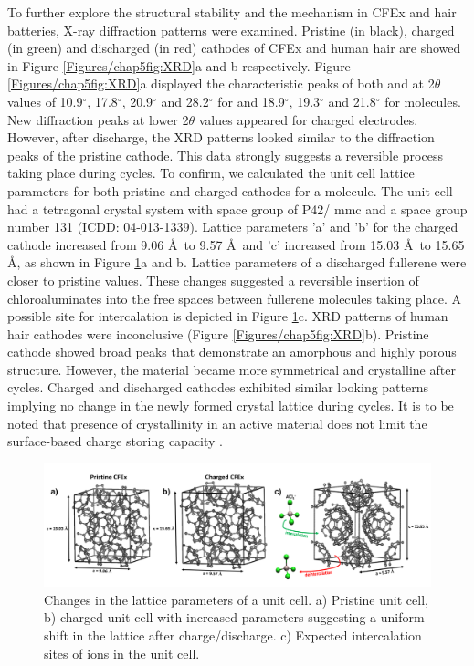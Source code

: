 To further explore the structural stability and the mechanism in CFEx and hair batteries, X-ray diffraction patterns were examined. Pristine (in black), charged (in green) and discharged (in red) cathodes of CFEx and human hair are showed in Figure \ref{Figures/chap5fig:XRD}a and b respectively. Figure \ref{Figures/chap5fig:XRD}a displayed the characteristic peaks of both  and  at 2$\theta$ values of 10.9$^{\circ}$, 17.8$^{\circ}$, 20.9$^{\circ}$ and 28.2$^{\circ}$ for  and 18.9$^{\circ}$, 19.3$^{\circ}$ and 21.8$^{\circ}$ for  molecules. New diffraction peaks at lower 2$\theta$ values appeared for charged electrodes. However, after discharge, the XRD patterns looked similar to the diffraction peaks of the pristine cathode. This data strongly suggests a reversible process taking place during cycles. To confirm, we calculated the unit cell lattice parameters for both pristine and charged cathodes for a  molecule. The unit cell had a tetragonal crystal system with space group of P42/ mmc and a space group number 131 (ICDD: 04-013-1339). Lattice parameters 'a' and 'b' for the charged cathode increased from 9.06 \AA\ to 9.57 \AA\ and 'c' increased from 15.03 \AA\ to 15.65 \AA, as shown in Figure \ref{Figures/chap5fig:cfexcrys}a and b. Lattice parameters of a discharged fullerene were closer to pristine values. These changes suggested a reversible insertion of chloroaluminates into the free spaces between fullerene molecules taking place. A possible site for  intercalation is depicted in Figure \ref{Figures/chap5fig:cfexcrys}c. XRD patterns of human hair cathodes were inconclusive (Figure \ref{Figures/chap5fig:XRD}b). Pristine cathode showed broad peaks that demonstrate an amorphous and highly porous structure. However, the material became more symmetrical and crystalline after cycles. Charged and discharged cathodes exhibited similar looking patterns implying no change in the newly formed crystal lattice during cycles. It is to be noted that presence of crystallinity in an active material does not limit the surface-based charge storing capacity \cite{kim_synthesis_2006, jow_factors_2018}. 

\begin{figure}[tbh!]
  \centering
  \includegraphics[width=\textwidth]{Figures/chap5fig/cfexcrys}
    \caption{Changes in the lattice parameters of a  unit cell. a) Pristine unit cell, b) charged unit cell with increased parameters suggesting a uniform shift in the lattice after charge/discharge. c) Expected intercalation sites of  ions in the unit cell.}
  \label{Figures/chap5fig:cfexcrys}
\end{figure}

